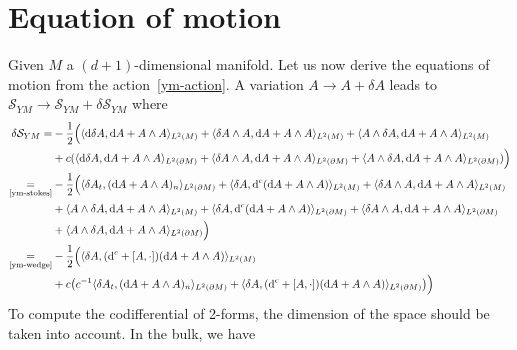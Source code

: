 \section{Equation of motion}
Given $M$ a $(d +1)$-dimensional manifold. 
Let us now derive the equations of motion from the action~\cref{ym-action}.
A variation $A \rightarrow A + \delta A$ leads to $\mathcal{S}_{YM} \rightarrow \mathcal{S}_{YM} + \delta\mathcal{S}_{YM}$ where
%
\begin{equation*}
\begin{split}
\delta \mathcal S_{YM} = & -\frac 1 2 \Big(
 \langle \dd \delta A, \dd A +A\wedge A  \rangle_{L^2(M)} +  
 \langle \delta A \wedge A, \dd A + A\wedge A \rangle_{L^2(M)} + 
 \langle A \wedge \delta A , \dd A + A\wedge A \rangle_{L^2(M)}  \\ & + 
 c (\langle \dd \delta A, \dd A +A\wedge A\rangle_{L^2(\partial M)}+
 \langle \delta A \wedge A, \dd A + A\wedge A  \rangle_{L^2(\partial M)} + 
 \langle A \wedge \delta A , \dd A + A\wedge A \rangle_{L^2(\partial M)} 
 )
 \Big) \\
 \underset{\textrm{\cref{ym-stokes}}}{=} & - \frac{1}{2} \Big(
 \langle \delta A_t, (\dd A + A\wedge A)_n \rangle_{L^2(\partial M)} +
 \langle \delta A, \dd^c (\dd A + A\wedge A) \rangle_{L^2(M)} + 
 \langle \delta A \wedge A,  \dd A + A \wedge A \rangle_{L^2(M)} \\ &+
 \langle A \wedge \delta A,  \dd A + A \wedge A \rangle_{L^2(M)}  +
 \langle \delta A, \dd^c (\dd A + A\wedge A) \rangle_{L^2(\partial M)} + 
 \langle \delta A \wedge A, \dd A + A \wedge A \rangle_{L^2(\partial M)} \\&+
 \langle A \wedge \delta A, \dd A + A \wedge A \rangle_{L^2(\partial M)}
 \Big) \\
\underset{\textrm{\cref{ym-wedge}}}{=} & - \frac 1 2 \Big(
\langle \delta A, (\dd^c + [A, \cdot ])(\dd A+ A \wedge A) \rangle_{L^2(M)} \\ &+
c \big( c^{-1}\langle \delta A_t, (\dd A + A\wedge A)_n \rangle_{L^2(\partial M)} +
\langle \delta A, (\dd^c + [A, \cdot ])(\dd A+ A \wedge A) \rangle_{L^2(\partial M)} \big)
\Big)
\end{split}
\end{equation*}
To compute the codifferential of 2-forms, the dimension of the space should be taken into account. In the bulk, we have
